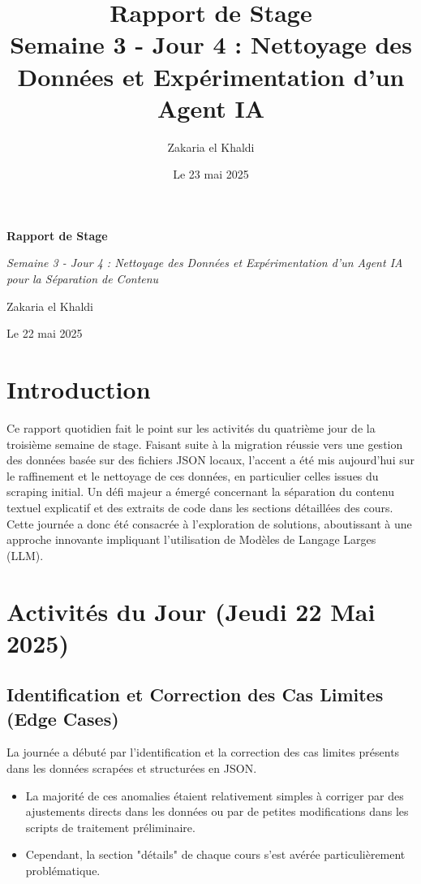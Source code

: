 \documentclass[12pt, a4paper]{article}
\title{\Huge\bfseries\color{primary} Rapport de Stage \\ 
      \Large Semaine 3 - Jour 4 : Nettoyage des Données et Expérimentation d'un Agent IA} %
\author{\Large Zakaria el Khaldi}
\date{\large Le 23 mai 2025} %
\begin{document}
\begin{titlepage}
  \centering
  {\Huge\bfseries\color{primary} Rapport de Stage \par}
  \vspace{1cm}
  {\Large\itshape Semaine 3 - Jour 4 : Nettoyage des Données et Expérimentation d'un Agent IA pour la Séparation de Contenu\par} %
  \vspace{2cm}
  
  \vspace{2cm}
  {\Large Zakaria el Khaldi\par}
  \vfill
  {\large Le 22 mai 2025\par} %
\end{titlepage}

\tableofcontents
\thispagestyle{empty}
\newpage

\section{Introduction}
\thispagestyle{fancy}
Ce rapport quotidien fait le point sur les activités du quatrième jour de la troisième semaine de stage. Faisant suite à la migration réussie vers une gestion des données basée sur des fichiers JSON locaux, l'accent a été mis aujourd'hui sur le raffinement et le nettoyage de ces données, en particulier celles issues du scraping initial. Un défi majeur a émergé concernant la séparation du contenu textuel explicatif et des extraits de code dans les sections détaillées des cours. Cette journée a donc été consacrée à l'exploration de solutions, aboutissant à une approche innovante impliquant l'utilisation de Modèles de Langage Larges (LLM).

\section{Activités du Jour (Jeudi 22 Mai 2025)} %

\subsection{Identification et Correction des Cas Limites (Edge Cases)}
La journée a débuté par l'identification et la correction des cas limites présents dans les données scrapées et structurées en JSON. 
\begin{itemize}
    \item La majorité de ces anomalies étaient relativement simples à corriger par des ajustements directs dans les données ou par de petites modifications dans les scripts de traitement préliminaire.
    \item Cependant, la section "détails" de chaque cours s'est avérée particulièrement problématique.
\end{itemize}
\end{document}
